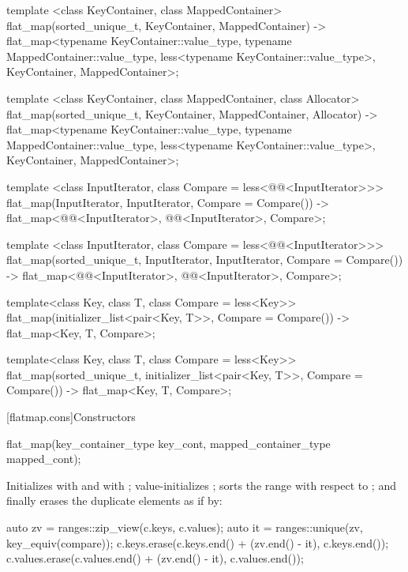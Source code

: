 \begin{addedblock}
\begin{codeblock}
{  template <class KeyContainer, class MappedContainer>
    flat_map(sorted_unique_t, KeyContainer, MappedContainer)
      -> flat_map<typename KeyContainer::value_type,
                  typename MappedContainer::value_type,
                  less<typename KeyContainer::value_type>,
                  KeyContainer, MappedContainer>;

  template <class KeyContainer, class MappedContainer, class Allocator>
    flat_map(sorted_unique_t, KeyContainer, MappedContainer, Allocator)
      -> flat_map<typename KeyContainer::value_type,
                  typename MappedContainer::value_type,
                  less<typename KeyContainer::value_type>,
                  KeyContainer, MappedContainer>;

  template <class InputIterator, class Compare = less<@@<InputIterator>>>
    flat_map(InputIterator, InputIterator, Compare = Compare())
      -> flat_map<@@<InputIterator>, @@<InputIterator>, Compare>;

  template <class InputIterator, class Compare = less<@@<InputIterator>>>
    flat_map(sorted_unique_t, InputIterator, InputIterator, Compare = Compare())
      -> flat_map<@@<InputIterator>, @@<InputIterator>, Compare>;

  template<class Key, class T, class Compare = less<Key>>
    flat_map(initializer_list<pair<Key, T>>, Compare = Compare())
      -> flat_map<Key, T, Compare>;

  template<class Key, class T, class Compare = less<Key>>
  flat_map(sorted_unique_t, initializer_list<pair<Key, T>>, Compare = Compare())
      -> flat_map<Key, T, Compare>;
}
\end{codeblock}

[flatmap.cons]{Constructors}

%
\begin{itemdecl}
flat_map(key_container_type key_cont, mapped_container_type mapped_cont);
\end{itemdecl}

\begin{itemdescr}
\pnum
\effects Initializes  with  and
 with ; value-initializes
; sorts the range  with respect to
; and finally erases the duplicate elements
as if by:
\begin{codeblock}
auto zv = ranges::zip_view(c.keys, c.values);
auto it = ranges::unique(zv, key_equiv(compare));
c.keys.erase(c.keys.end() + (zv.end() - it), c.keys.end());
c.values.erase(c.values.end() + (zv.end() - it), c.values.end());
\end{codeblock}


\end{itemdescr}
\end{addedblock}
